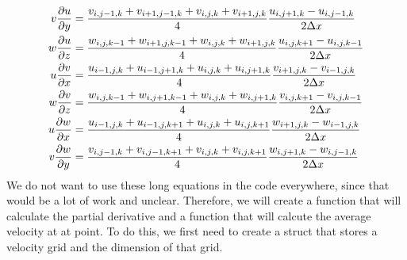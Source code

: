 \documentclass{article}
\begin{document}
\[\begin{split}
  v\pdv{u}{y}&=\frac{v_{i,j-1,k}+v_{i+1,j-1,k}+v_{i,j,k}+v_{i+1,j,k}}{4}\frac{u_{i,j+1,k}-u_{i,j-1,k}}{2\Delta x}\\
  w\pdv{u}{z}&=\frac{w_{i,j,k-1}+w_{i+1,j,k-1}+w_{i,j,k}+w_{i+1,j,k}}{4}\frac{u_{i,j,k+1}-u_{i,j,k-1}}{2\Delta x}\\
  u\pdv{v}{x}&=\frac{u_{i-1,j,k}+u_{i-1,j+1,k}+u_{i,j,k}+u_{i,j+1,k}}{4}\frac{v_{i+1,j,k}-v_{i-1,j,k}}{2\Delta x}\\
  w\pdv{v}{z}&=\frac{w_{i,j,k-1}+w_{i,j+1,k-1}+w_{i,j,k}+w_{i,j+1,k}}{4}\frac{v_{i,j,k+1}-v_{i,j,k-1}}{2\Delta x}\\
  u\pdv{w}{x}&=\frac{u_{i-1,j,k}+u_{i-1,j,k+1}+u_{i,j,k}+u_{i,j,k+1}}{4}\frac{w_{i+1,j,k}-w_{i-1,j,k}}{2\Delta x}\\
  v\pdv{w}{y}&=\frac{v_{i,j-1,k}+v_{i,j-1,k+1}+v_{i,j,k}+v_{i,j,k+1}}{4}\frac{w_{i,j+1,k}-w_{i,j-1,k}}{2\Delta x}\\
\end{split}
\] \label{average and partial}
We do not want to use these long equations in the code everywhere, since that would be a lot of work and unclear. Therefore, we will create a function that will calculate the partial derivative and a function that will calcute the average velocity at at point. To do this, we first need to create a struct that stores a velocity grid and the dimension of that grid.
\end{document}
